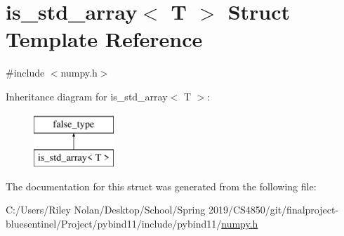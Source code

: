 \hypertarget{structis__std__array}{}\section{is\+\_\+std\+\_\+array$<$ T $>$ Struct Template Reference}
\label{structis__std__array}


{\ttfamily \#include $<$numpy.\+h$>$}

Inheritance diagram for is\+\_\+std\+\_\+array$<$ T $>$\+:\begin{figure}[H]
\begin{center}
\leavevmode
\includegraphics[height=2.000000cm]{structis__std__array}
\end{center}
\end{figure}


The documentation for this struct was generated from the following file\+:\begin{DoxyCompactItemize}
\item 
C\+:/\+Users/\+Riley Nolan/\+Desktop/\+School/\+Spring 2019/\+C\+S4850/git/finalproject-\/bluesentinel/\+Project/pybind11/include/pybind11/\mbox{\hyperlink{numpy_8h}{numpy.\+h}}\end{DoxyCompactItemize}
